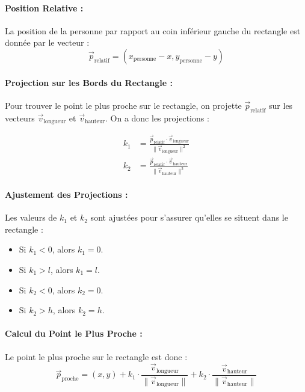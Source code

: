 \documentclass[a4paper,12pt]{article}
\begin{document}
\paragraph{Position Relative :}

La position de la personne par rapport au coin inférieur gauche du rectangle est donnée par le vecteur :
\[
\vec{p}_{\text{relatif}} = (x_{\text{personne}} - x, y_{\text{personne}} - y)
\]

\paragraph{Projection sur les Bords du Rectangle :}

Pour trouver le point le plus proche sur le rectangle, on projette $\vec{p}_{\text{relatif}}$ sur les vecteurs $\vec{v}_{\text{longueur}}$ et $\vec{v}_{\text{hauteur}}$. On a donc les projections :

\begin{align*}
k_1 &= \frac{\vec{p}_{\text{relatif}} \cdot \vec{v}_{\text{longueur}}}{\|\vec{v}_{\text{longueur}}\|^2} \\
k_2 &= \frac{\vec{p}_{\text{relatif}} \cdot \vec{v}_{\text{hauteur}}}{\|\vec{v}_{\text{hauteur}}\|^2}
\end{align*}

\paragraph{Ajustement des Projections :}

Les valeurs de $k_1$ et $k_2$ sont ajustées pour s'assurer qu'elles se situent dans le rectangle :
\begin{itemize}
    \item Si $k_1 < 0$, alors $k_1 = 0$.
    \item Si $k_1 > l$, alors $k_1 = l$.
    \item Si $k_2 < 0$, alors $k_2 = 0$.
    \item Si $k_2 > h$, alors $k_2 = h$.
\end{itemize}

\paragraph{Calcul du Point le Plus Proche :}

Le point le plus proche sur le rectangle est donc :
\[
\vec{p}_{\text{proche}} = (x, y) + k_1 \cdot \frac{\vec{v}_{\text{longueur}}}{\|\vec{v}_{\text{longueur}}\|} + k_2 \cdot \frac{\vec{v}_{\text{hauteur}}}{\|\vec{v}_{\text{hauteur}}\|}
\]
\end{document}
